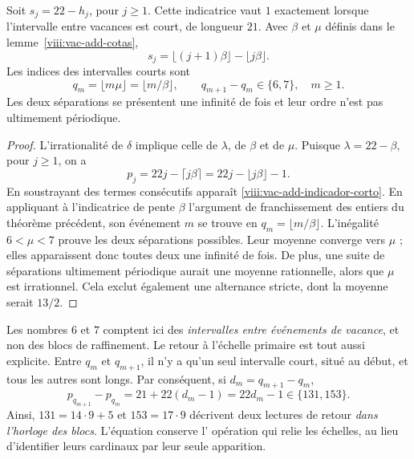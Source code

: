 \begin{theorem}
\label{viii:vac-add-teorema-secundario}
Soit \(s_j=22-h_j\), pour \(j\geq1\). Cette indicatrice vaut \(1\) exactement lorsque l'intervalle entre vacances est court, de longueur \(21\). Avec \(\beta\) et \(\mu\) définis dans le lemme~\ref{viii:vac-add-cotas},
\begin{equation}
 s_j=\lfloor(j+1)\beta\rfloor-\lfloor j\beta\rfloor.
 \label{viii:vac-add-indicador-corto}
\end{equation}
Les indices des intervalles courts sont
\begin{equation}
 q_m=\lfloor m\mu\rfloor=\lfloor m/\beta\rfloor,
 \qquad q_{m+1}-q_m\in\{6,7\},\quad m\geq1.
 \label{viii:vac-add-posiciones-cortos}
\end{equation}
Les deux séparations se présentent une infinité de fois et leur ordre n'est pas
ultimement périodique.
\end{theorem}
\begin{proof}
L'irrationalité de \(\delta\) implique celle de \(\lambda\),
de \(\beta\) et de \(\mu\). Puisque \(\lambda=22-\beta\), pour
\(j\geq1\), on a
\[
 p_j=22j-\lceil j\beta\rceil
     =22j-\lfloor j\beta\rfloor-1.
\]
En soustrayant des termes consécutifs apparaît
\eqref{viii:vac-add-indicador-corto}. En appliquant à l'indicatrice de pente
\(\beta\) l'argument de franchissement des entiers du théorème précédent,
son événement \(m\) se trouve en \(q_m=\lfloor m/\beta\rfloor\).
L'inégalité \(6<\mu<7\) prouve les deux séparations possibles.
Leur moyenne converge vers \(\mu\) ; elles apparaissent donc toutes deux une infinité
de fois. De plus, une suite de séparations ultimement périodique
aurait une moyenne rationnelle, alors que \(\mu\) est irrationnel. Cela exclut
également une alternance stricte, dont la moyenne serait \(13/2\).
\end{proof}

Les nombres \(6\) et \(7\) comptent ici des \emph{intervalles entre événements de vacance}, et non des blocs de raffinement. Le retour à l'échelle primaire est tout aussi explicite. Entre \(q_m\) et \(q_{m+1}\), il n'y a qu'un seul intervalle court, situé au début, et tous les autres sont longs. Par conséquent, si \(d_m=q_{m+1}-q_m\),
\begin{equation}
 p_{q_{m+1}}-p_{q_m}=21+22(d_m-1)=22d_m-1
 \in\{131,153\}.
 \label{viii:vac-add-retorno-bloques}
\end{equation}
Ainsi, \(131=14\cdot9+5\) et \(153=17\cdot9\) décrivent deux lectures
de retour \emph{dans l'horloge des blocs}. L'équation conserve l'
opération qui relie les échelles, au lieu d'identifier leurs
cardinaux par leur seule apparition.

